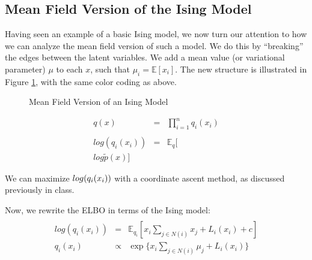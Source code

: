 \documentclass[twoside]{article}
\begin{document}
\subsection{Mean Field Version of the Ising Model}

Having seen an example of a basic Ising model,  we now turn our attention to how we can analyze the mean field version of such a model.  We do this by ``breaking'' the edges between the latent variables.  We add a mean value (or variational parameter) $\mu$ to each $x$,  such that $\mu_i=\mathbb{E}[x_i]$.  The new structure is illustrated in Figure \ref{meanfield},  with the same color coding as above.  

\begin{figure}[h!]
\begin{center}
\end{center}
\caption{Mean Field Version of an Ising Model}
\label{meanfield}
\end{figure}


\begin{eqnarray*}
q(x) &=& \prod_{i=1}^n q_i (x_i) \\
\\log ( q_i (x_i)) &=& \mathbb{E}_q [ \\log \tilde{p}(x) ]
\end{eqnarray*}

We can maximize $\\log ( q_i (x_i))$ with a coordinate ascent method,  as discussed previously in class. 

Now,  we rewrite the ELBO in terms of the Ising model:
\begin{eqnarray*}
\\log (q_i (x_i)) &=& \mathbb{E}_{q_i} [ x_i \sum_{j \in N(i)} x_j + L_i(x_i) +c ] \\
q_i (x_i) &\propto& \exp \{ x_i \sum_{j \in N(i)} \mu_j + L_i(x_i) \}
\end{eqnarray*}
\end{document}
